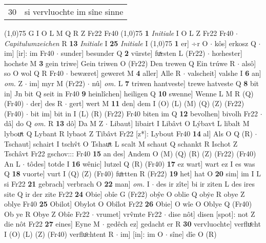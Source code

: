 \documentclass[8pt,a4paper,notitlepage]{article}
\begin{document}
\begin{table}[ht]
\begin{minipage}[t]{0.5\linewidth}
\begin{tabular}{rl}
30 & si vervluochte im sîne sinne\\ 
\end{tabular}
\scriptsize
\line(1,0){75} \newline
G I O L M Q R Z Fr22 Fr40 \newline
\line(1,0){75} \newline
\textbf{1} \textit{Initiale} I O L Z Fr22 Fr40   $\cdot$ \textit{Capitulumzeichen} R  \textbf{13} \textit{Initiale} I  \textbf{25} \textit{Initiale} I  \newline
\line(1,0){75} \newline
\textbf{1} er] ÷r O  $\cdot$ kôs] erkosz Q  $\cdot$ im] [ir]: im Fr40  $\cdot$ sunder] besunder Q \textbf{2} vürste] fuͯrsten L (Fr22)  $\cdot$ hœhester] hochste M \textbf{3} gein triwe] Gein triwen O (Fr22) Den trewen Q Ein trúwe R  $\cdot$ alsô] so O wol Q R Fr40  $\cdot$ bewæret] geweret M \textbf{4} aller] Alle R  $\cdot$ valscheit] valshe I \textbf{6} an] \textit{om.} Z  $\cdot$ im] myr M (Fr22)  $\cdot$ nû] \textit{om.} L \textbf{7} triwen hantveste] trewe hatveste Q \textbf{8} bit in] Jn bit Q seit in Fr40 \textbf{9} heinlîchen] heiligen Q \textbf{10} swenne] Wenne L M R (Q) (Fr40)  $\cdot$ der] des R  $\cdot$ gert] wert M \textbf{11} den] dem I (O) (L) (M) (Q) (Z) (Fr22) (Fr40)  $\cdot$ bit im] bit in I (L) (R) (Fr22) Fr40 biten im Q \textbf{12} bevolhen] bivolh Fr22  $\cdot$ dâ] do Q \textit{om.} R \textbf{13} dô] Da M Z  $\cdot$ Libaut] libairt I Libâvt O Lýbavt L libalt M lybouͯt Q Lybant R lybaot Z Tibâvt Fr22 [z*]: Lybout Fr40 \textbf{14} al] Als O Q (R)  $\cdot$ Tschaut] schairt I tschv̂t O Tshauͯt L scalt M schaut Q schankt R Ischot Z Tschâvt Fr22 gschov::: Fr40 \textbf{15} an des] Andem O (M) (Q) (R) (Z) (Fr22) (Fr40) An L  $\cdot$ tôdes] totde I \textbf{16} wênic] lutzel Q (R) (Fr40) \textbf{17} ez wart] wart ez I es was Q \textbf{18} vuorte] vurt I (Q) (Z) (Fr40) fuͦrtten R (Fr22) \textbf{19} het] hat O \textbf{20} sim] im I L si Fr22 \textbf{21} gebrach] verbrach O \textbf{22} man] \textit{om.} I  $\cdot$ des ir zîte] bi ir ziten L des ires site Q ir der zite Fr22 \textbf{24} Obie] obîe G (Fr22) obŷe O oblie Q obẏe R obye Z oblye Fr40 \textbf{25} Obilot] Obylot O Obîlot Fr22 \textbf{26} Obie] O wîe O Oblye Q (Fr40) Ob ye R Obye Z Obîe Fr22  $\cdot$ vrumet] vrv̂mte Fr22  $\cdot$ dise nôt] disen [spot]: not Z die nôt Fr22 \textbf{27} eines] Eyne M  $\cdot$ gedêch ez] gedacht er R \textbf{30} vervluochte] verfluͤcht I (O) (L) (Z) (Fr40) verfluͦchtent R  $\cdot$ im] [in]: im O  $\cdot$ sîne] dîe O (R) \newline

\end{minipage}
\end{table}
\end{document}
